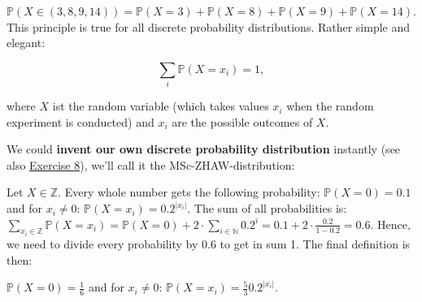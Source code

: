 \documentclass[
]{book}
\begin{document}
\(\mathbb{P}(X \in (3,8,9,14)) = \mathbb{P}(X = 3) + \mathbb{P}(X = 8) + \mathbb{P}(X = 9) + \mathbb{P}(X = 14)\).
This principle is true for all discrete probability distributions. Rather simple and elegant:

\[\sum_{i} \mathbb{P}(X = x_i) = 1,\]

where \(X\) ist the random variable (which takes values \(x_i\) when the random experiment is conducted) and \(x_i\) are the possible outcomes of \(X\).

We could \textbf{invent our own discrete probability distribution} instantly (see also \hyperref[exercise8]{Exercise 8}), we'll call it the MSc-ZHAW-distribution:

Let \(X \in \mathbb{Z}\). Every whole number gets the following probability:
\(\mathbb{P}(X=0) = 0.1\) and for \(x_i \neq 0\): \(\mathbb{P}(X = x_i) = 0.2^{|x_i|}\).
The sum of all probabilities is: \(\sum_{x_i \in \mathbb{Z}} \mathbb{P}(X=x_i) = \mathbb{P}(X=0) + 2 \cdot \sum_{i \in \mathbb{N}} 0.2^i =
0.1 + 2 \cdot \frac{0.2}{1-0.2} = 0.6\). Hence, we need to divide every probability by 0.6 to get in sum 1.
The final definition is then:

\(\mathbb{P}(X=0) = \frac{1}{6}\) and for \(x_i \neq 0\): \(\mathbb{P}(X = x_i) = \frac{5}{3} 0.2^{|x_i|}\).
\end{document}
